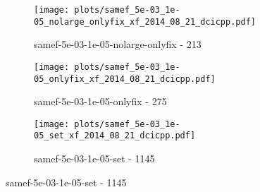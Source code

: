 \begin{figure}[H]
\begin{subfigure}{0.48\textwidth}
  \end{subfigure}
  \begin{subfigure}{0.48\textwidth}
    \texttt{[image: plots/samef\_5e-03\_1e-05\_nolarge\_onlyfix\_xf\_2014\_08\_21\_dcicpp.pdf]}
    \caption{samef-5e-03-1e-05-nolarge-onlyfix - 213}
  \end{subfigure}
  \begin{subfigure}{0.48\textwidth}
    \texttt{[image: plots/samef\_5e-03\_1e-05\_onlyfix\_xf\_2014\_08\_21\_dcicpp.pdf]}
    \caption{samef-5e-03-1e-05-onlyfix - 275}
  \end{subfigure}
  \begin{subfigure}{0.48\textwidth}
    \texttt{[image: plots/samef\_5e-03\_1e-05\_set\_xf\_2014\_08\_21\_dcicpp.pdf]}
    \caption{samef-5e-03-1e-05-set - 1145}
  \end{subfigure}
\end{figure}

